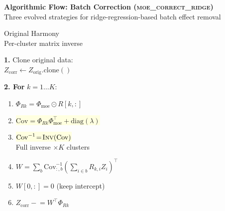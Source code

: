 \documentclass[8pt]{article}
\newlength{\colw}
\begin{document}
\newpage
\setlength{\colw}{0.32\textwidth}

\begin{center}
{\large\bfseries Algorithmic Flow: Batch Correction (\textsc{moe\_correct\_ridge})}\\[1pt]
{\scriptsize Three evolved strategies for ridge-regression-based batch effect removal}
\end{center}
\vspace{2pt}

\noindent
\begin{minipage}[t]{\colw}
\begin{tcolorbox}[colback=hdrA, colframe=hdrA, fontupper=\bfseries\footnotesize\color{white},
    arc=2pt, left=2pt, right=2pt, top=1pt, bottom=1pt]
\centering Original Harmony\\[-2pt]
{\scriptsize\mdseries Per-cluster matrix inverse}
\end{tcolorbox}
\vspace{1pt}

\begin{stepbox}
\textbf{1.} Clone original data:\\
$Z_\text{corr} \gets Z_\text{orig}.\text{clone}()$
\end{stepbox}\vspace{1pt}

\begin{warnbox}
\textbf{2. For} $k=1\ldots K$:
\begin{enumerate}[leftmargin=1em, itemsep=0pt, topsep=1pt, parsep=0pt]
\item $\Phi_{Rk}\!=\!\Phi_\text{moe}\!\odot\!R[k,:]$
\item \colorbox{lightyellow}{$\text{Cov}\!=\!\Phi_{Rk}\Phi_\text{moe}^\top\!+\!\text{diag}(\lambda)$}
\item \colorbox{lightyellow}{$\text{Cov}^{-1}\!=\!\textsc{Inv}(\text{Cov})$}\\
    {\scriptsize\color{removed} Full inverse $\times K$ clusters}
\item $W\!=\!\sum_b \text{Cov}^{-1}_{:,b}(\sum_{i\in b} R_{k,i}Z_i)^\top$
\item $W[0,:]\!=\!0$ {\scriptsize (keep intercept)}
\item $Z_\text{corr} \mathrel{-}\!=\! W^\top \Phi_{Rk}$
\end{enumerate}
\end{warnbox}\vspace{1pt}


\end{minipage}
\end{document}

